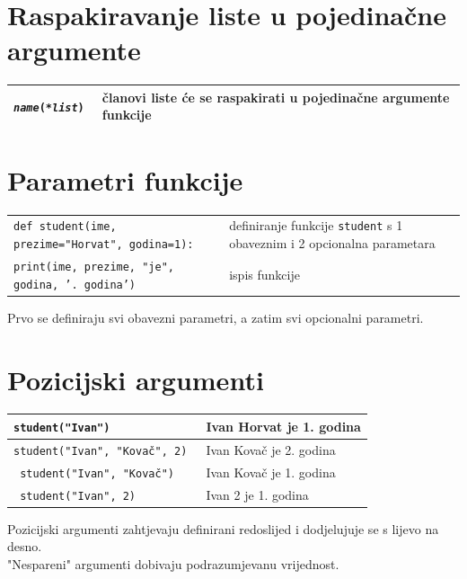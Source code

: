 \documentclass[10pt]{article}
\begin{document}
    \section*{\color{NavyBlue} Raspakiravanje liste u pojedinačne argumente}
    \begin{tabular}{|>{\tt}p{9.00cm}|>{}p{15.50cm}|}
        \hline
        \textit{name}(\textit{*list}) & članovi liste će se \textbf{raspakirati} u \textbf{pojedinačne argumente} funkcije
        \\ \hline
    \end{tabular}

    \section*{\color{NavyBlue} Parametri funkcije}
    \begin{tabular}{|>{\tt}p{9.00cm}|>{}p{15.50cm}|}
        \hline
        def student(ime, prezime="Horvat", godina=1):                           & definiranje funkcije \texttt{student} s 1 obaveznim i 2 opcionalna parametara \\
        \hspace{5mm}print(ime, prezime, "je", godina, '. godina')               & ispis funkcije \\ \hline
    \end{tabular}
    \begin{center}
        \footnotesize
        Prvo se definiraju svi obavezni parametri, a zatim svi opcionalni parametri.
    \end{center}

    \section*{\color{NavyBlue} Pozicijski argumenti}
    \begin{tabular}{|>{\tt}p{9.00cm}|>{}p{15.50cm}|}
        \hline
        student("Ivan")               & Ivan Horvat je 1. godina \\ \hline
        student("Ivan", "Kovač", 2)   & Ivan Kovač je 2. godina \\ \hline
        student("Ivan", "Kovač")      & Ivan Kovač je 1. godina \\ \hline
        student("Ivan", 2)            & Ivan 2 je 1. godina \\ \hline
    \end{tabular}
    \begin{center}
        \footnotesize
        Pozicijski argumenti zahtjevaju definirani redoslijed i dodjelujuje se s lijevo na desno. \\
        "Nespareni" argumenti dobivaju podrazumjevanu vrijednost.
    \end{center}
\end{document}

